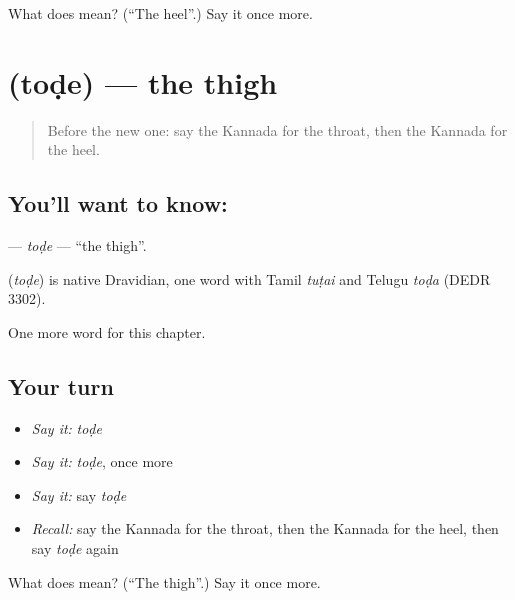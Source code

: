\begin{tcolorbox}[breakable,colback=teal!4,colframe=teal!35!black,title={Before you move on}]
What does  mean? (\textquotedblleft{}The heel\textquotedblright{}.) Say it once more.
\end{tcolorbox}
\section[\texorpdfstring{\kn{ತೊಡೆ} (toḍe)}{ತೊಡೆ (toḍe)}]{ (toḍe) — the thigh}

\label{lesson:KA-C168-tode}



\begin{quote}
Before the new one: say the Kannada for the throat, then the Kannada for the heel.
\end{quote}

\subsection*{You'll want to know: }
\textbf{} — \emph{toḍe} — \textquotedblleft{}the thigh\textquotedblright{}.

\begin{cousinweb}
\textbf{} (\emph{toḍe}) is native Dravidian, one word with Tamil \emph{tuṭai} and Telugu \emph{toḍa} (DEDR 3302).
\end{cousinweb}

\begin{grammarlens}[title={What you've built}]
One more word for this chapter.
\end{grammarlens}

\subsection*{Your turn}
\begin{itemize}
\raggedright
  \item \emph{Say it:} \emph{toḍe}
  \item \emph{Say it:} \emph{toḍe}, once more
  \item \emph{Say it:} say \emph{toḍe}
  \item \emph{Recall:} say the Kannada for the throat, then the Kannada for the heel, then say \emph{toḍe} again
\end{itemize}

\begin{tcolorbox}[breakable,colback=teal!4,colframe=teal!35!black,title={Before you move on}]
What does  mean? (\textquotedblleft{}The thigh\textquotedblright{}.) Say it once more.
\end{tcolorbox}
